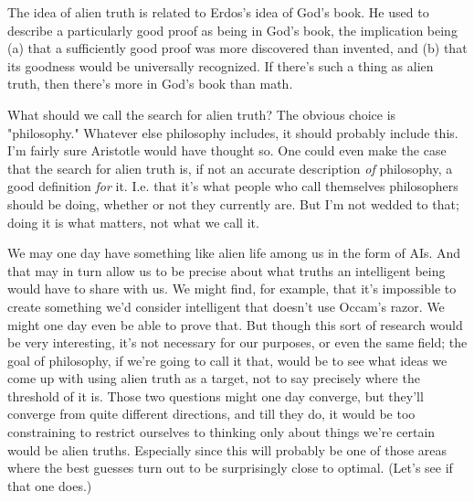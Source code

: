 The idea of alien
                  truth is related to Erdos's idea of God's book. He used to
                  describe a particularly good proof as being in God's book, the
                  implication being (a) that a sufficiently good proof was more
                  discovered than invented, and (b) that its goodness would be
                  universally recognized. If there's such a thing as alien
                  truth, then there's more in God's book than math.

What
                  should we call the search for alien truth? The obvious choice
                  is "philosophy." Whatever else philosophy includes, it should
                  probably include this. I'm fairly sure Aristotle would have
                  thought so. One could even make the case that the search for
                  alien truth is, if not an accurate description
                  \emph{of} philosophy, a good definition \emph{for} it. I.e.
                  that it's what people who call themselves philosophers should
                  be doing, whether or not they currently are. But I'm not
                  wedded to that; doing it is what matters, not what we call
                  it.

We may one day have something like alien life
                  among us in the form of AIs. And that may in turn allow us to
                  be precise about what truths an intelligent being would have
                  to share with us. We might find, for example, that it's
                  impossible to create something we'd consider intelligent that
                  doesn't use Occam's razor. We might one day even be able to
                  prove that. But though this sort of research would be very
                  interesting, it's not necessary for our purposes, or even the
                  same field; the goal of philosophy, if we're going to call it
                  that, would be to see what ideas we come up with using alien
                  truth as a target, not to say precisely where the threshold of
                  it is. Those two questions might one day converge, but they'll
                  converge from quite different directions, and till they do, it
                  would be too constraining to restrict ourselves to thinking
                  only about things we're certain would be alien truths.
                  Especially since this will probably be one of those areas
                  where the best guesses turn out to be surprisingly close to
                  optimal. (Let's see if that one does.)

